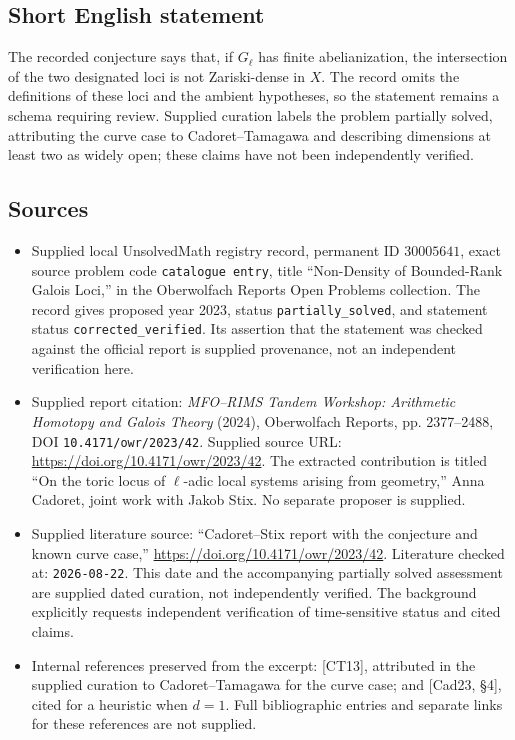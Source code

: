 \documentclass[11pt]{article}
\begin{document}
\subsection{Short English statement}
The recorded conjecture says that, if \(G_\ell\) has finite abelianization, the intersection of the two designated loci is not Zariski-dense in \(X\). The record omits the definitions of these loci and the ambient hypotheses, so the statement remains a schema requiring review. Supplied curation labels the problem partially solved, attributing the curve case to Cadoret--Tamagawa and describing dimensions at least two as widely open; these claims have not been independently verified.
\subsection{Sources}
\begin{itemize}
\item Supplied local UnsolvedMath registry record, permanent ID \(30005641\), exact source problem code \texttt{catalogue entry}, title ``Non-Density of Bounded-Rank Galois Loci,'' in the Oberwolfach Reports Open Problems collection. The record gives proposed year 2023, status \texttt{partially\_solved}, and statement status \texttt{corrected\_verified}. Its assertion that the statement was checked against the official report is supplied provenance, not an independent verification here.
\item Supplied report citation: \emph{MFO--RIMS Tandem Workshop: Arithmetic Homotopy and Galois Theory} (2024), Oberwolfach Reports, pp. 2377--2488, DOI \texttt{10.4171/owr/2023/42}. Supplied source URL: \url{https://doi.org/10.4171/owr/2023/42}. The extracted contribution is titled ``On the toric locus of \(\ell\)-adic local systems arising from geometry,'' Anna Cadoret, joint work with Jakob Stix. No separate proposer is supplied.
\item Supplied literature source: ``Cadoret--Stix report with the conjecture and known curve case,'' \url{https://doi.org/10.4171/owr/2023/42}. Literature checked at: \texttt{2026-08-22}. This date and the accompanying partially solved assessment are supplied dated curation, not independently verified. The background explicitly requests independent verification of time-sensitive status and cited claims.
\item Internal references preserved from the excerpt: [CT13], attributed in the supplied curation to Cadoret--Tamagawa for the curve case; and [Cad23, \S 4], cited for a heuristic when \(d=1\). Full bibliographic entries and separate links for these references are not supplied.
\end{itemize}
\end{document}

